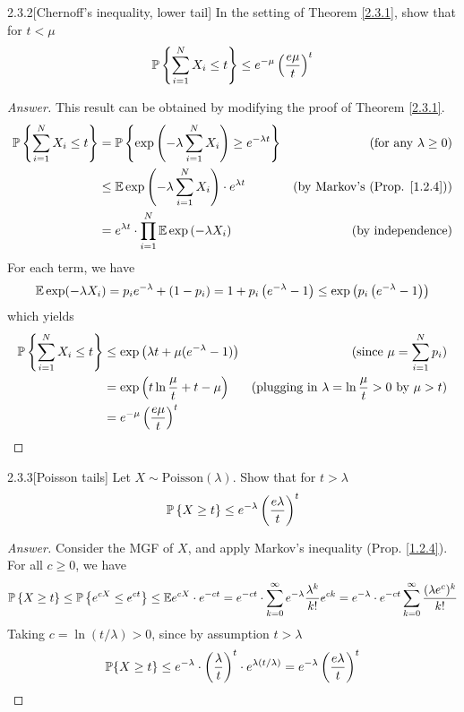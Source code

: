 {\begin{ex}{2.3.2}[Chernoff's inequality, lower tail]\label{2.3.2}
In the setting of Theorem \ref{2.3.1}, show that for $t < \mu$
\begin{align*}
    \mathbb{P} \left\{\sum_{i=1}^N X_i \leq t \right\} \leq e^{-\mu}\left(\frac {e \mu} {t}\right)^t
\end{align*}
\end{ex}
\begin{proof}[Answer]
This result can be obtained by modifying the proof of Theorem \ref{2.3.1}.
\begin{align*}
    \mathbb{P} \left\{\sum_{i=1}^N X_i \leq t \right\} &= \mathbb{P} \left\{\exp\left(-\lambda\sum_{i=1}^N X_i\right) \geq e^{-\lambda t} \right\} &\text{(for any $\lambda\geq 0$)} \\
    &\leq \mathbb{E} \exp\left(-\lambda\sum_{i=1}^N X_i\right) \cdot e^{\lambda t} &\text{(by Markov's (Prop. \ref{1.2.4}))} \\
    &= e^{\lambda t} \cdot \prod_{i=1}^N \mathbb{E} \exp\left( -\lambda X_i\right) &\text{(by independence)}
\end{align*}
For each term, we have
\begin{align*}
    \mathbb{E} \exp(-\lambda X_i) = p_i e^{-\lambda} + (1-p_i) = 1 + p_i\left(e^{-\lambda} -1\right) \leq \exp \left(p_i\left(e^{-\lambda} - 1\right)\right)
\end{align*}
which yields
\begin{align*}
    \mathbb{P} \left\{\sum_{i=1}^N X_i \leq t \right\} &\leq \exp \left( \lambda t + \mu(e^{-\lambda} - 1)\right) &\text{(since $\mu= \sum_{i=1}^N p_i$)} \\
    &= \exp \left(t \ln \frac \mu t + t - \mu\right) &\text{(plugging in $\lambda = \ln \frac \mu t > 0$ by $\mu>t$)} \\
    &= e^{-\mu}\left(\frac {e\mu} t\right)^t
\end{align*}
\end{proof}

\begin{ex}{2.3.3}[Poisson tails]\label{2.3.3}
Let $X \sim \text{Poisson}(\lambda)$. Show that for $t > \lambda$
\begin{align*}
    \mathbb{P} \left\{X \geq t \right\} \leq e^{-\lambda} \left( \frac {e\lambda} {t}\right)^t
\end{align*}
\begin{proof}[Answer] Consider the MGF of $X$, and apply Markov's inequality (Prop. \ref{1.2.4}). For all $c \geq 0$, we have
\begin{align*}
    \mathbb{P} \left\{ X \geq t\right\} \leq \mathbb{P} \left\{e^{cX} \leq e^{ct}\right\} \leq \mathbb{E} e^{cX} \cdot e^{-ct} = e^{-ct}\cdot\sum_{k=0}^\infty e^{-\lambda}\frac{\lambda^k}{k!}e^{ck} = e^{-\lambda} \cdot e^{-ct} \sum_{k=0}^\infty\frac{(\lambda e^c)^k}{k!}
\end{align*}
Taking $c = \ln (t/\lambda) > 0$, since by assumption $t > \lambda$
\begin{align*}
    \mathbb{P} \{ X \geq t\} \leq e^{-\lambda}\cdot\left(\frac {\lambda} t\right)^t \cdot e^{\lambda (t/\lambda)} = e^{-\lambda}\left(\frac {e\lambda} t\right)^t
\end{align*}


\end{proof}
\end{ex}}
